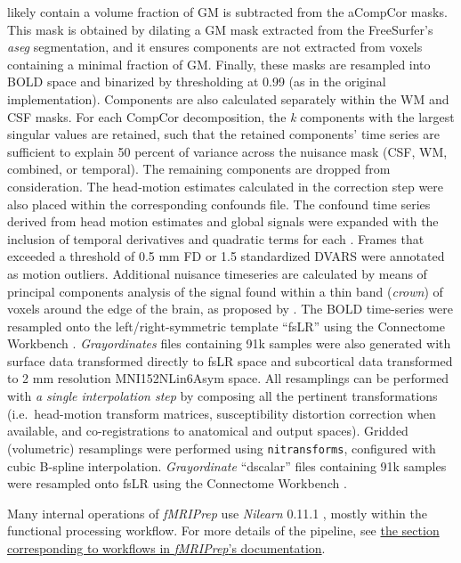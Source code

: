 \documentclass[
]{article}
\begin{document}
\begin{description}
likely contain a volume fraction of GM is subtracted from the aCompCor
masks. This mask is obtained by dilating a GM mask extracted from the
FreeSurfer's \emph{aseg} segmentation, and it ensures components are not
extracted from voxels containing a minimal fraction of GM. Finally,
these masks are resampled into BOLD space and binarized by thresholding
at 0.99 (as in the original implementation). Components are also
calculated separately within the WM and CSF masks. For each CompCor
decomposition, the \emph{k} components with the largest singular values
are retained, such that the retained components' time series are
sufficient to explain 50 percent of variance across the nuisance mask
(CSF, WM, combined, or temporal). The remaining components are dropped
from consideration. The head-motion estimates calculated in the
correction step were also placed within the corresponding confounds
file. The confound time series derived from head motion estimates and
global signals were expanded with the inclusion of temporal derivatives
and quadratic terms for each \citep{confounds_satterthwaite_2013}.
Frames that exceeded a threshold of 0.5 mm FD or 1.5 standardized DVARS
were annotated as motion outliers. Additional nuisance timeseries are
calculated by means of principal components analysis of the signal found
within a thin band (\emph{crown}) of voxels around the edge of the
brain, as proposed by \citep{patriat_improved_2017}. The BOLD
time-series were resampled onto the left/right-symmetric template
``fsLR'' using the Connectome Workbench \citep{hcppipelines}.
\emph{Grayordinates} files \citep{hcppipelines} containing 91k samples
were also generated with surface data transformed directly to fsLR space
and subcortical data transformed to 2 mm resolution MNI152NLin6Asym
space. All resamplings can be performed with \emph{a single
interpolation step} by composing all the pertinent transformations
(i.e.~head-motion transform matrices, susceptibility distortion
correction when available, and co-registrations to anatomical and output
spaces). Gridded (volumetric) resamplings were performed using
\texttt{nitransforms}, configured with cubic B-spline interpolation.
\emph{Grayordinate} ``dscalar'' files containing 91k samples were
resampled onto fsLR using the Connectome Workbench \citep{hcppipelines}.
\end{description}

Many internal operations of \emph{fMRIPrep} use \emph{Nilearn} 0.11.1
\citep[RRID:SCR\_001362]{nilearn}, mostly within the functional
processing workflow. For more details of the pipeline, see
\href{https://fmriprep.readthedocs.io/en/latest/workflows.html}{the
section corresponding to workflows in \emph{fMRIPrep}'s documentation}.
\end{document}
